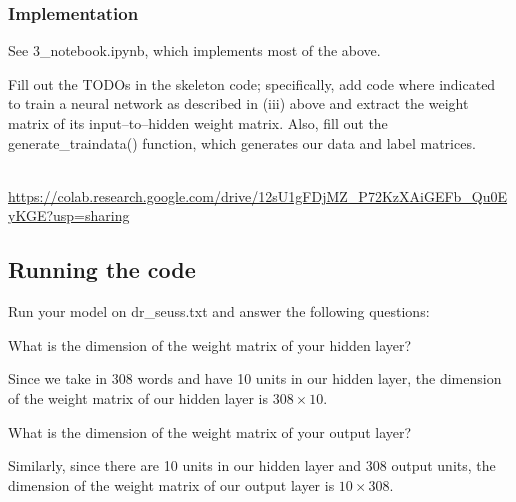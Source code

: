 \subsubsection{Implementation}

See 3_notebook.ipynb, which implements most of the above.

\problem[10]
Fill out the TODOs in the skeleton code; specifically, add code where indicated to train a neural network as described in (iii) above and extract the weight matrix of its input--to--hidden weight matrix. Also, fill out the generate\_traindata() function, which generates our data and label matrices.


\begin{solution}
\\ \url{https://colab.research.google.com/drive/12sU1gFDjMZ_P72KzXAiGEFb_Qu0EyKGE?usp=sharing}
\end{solution}

\subsection{Running the code}
Run your model on dr_seuss.txt and answer the following questions:

\problem[2]
What is the dimension of the weight matrix of your hidden layer?

\begin{solution}
	Since we take in 308 words and have 10 units in our hidden layer, the dimension of the weight matrix of our hidden layer is $308 \times 10$.
\end{solution}

\problem[2]
What is the dimension of the weight matrix of your output layer?
\begin{solution}
	Similarly, since there are 10 units in our hidden layer and 308 output units, the dimension of the weight matrix of our output layer is $10 \times 308$.
\end{solution}

